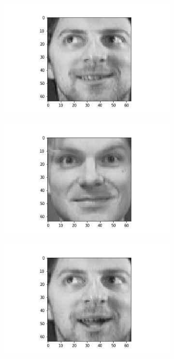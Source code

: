 \documentclass[12pt, a4paper]{article}
\begin{document}
\begin{figure}[h]
\begin{subfigure}{0.3\linewidth}
        \includegraphics[width=\linewidth]{images/q3/c/8/2.png}
    \end{subfigure}
    \newline
    \begin{subfigure}{0.3\linewidth}
        \centering
        \includegraphics[width=\linewidth]{images/q3/c/8/3.png}
    \end{subfigure}
    \hfill
    \begin{subfigure}{0.3\linewidth}
        \centering
        \includegraphics[width=\linewidth]{images/q3/c/8/4.png}

\end{subfigure}
\end{figure}
\end{document}
